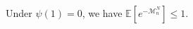 \begin{lemma}\label{lemma:M:exp-neg-moment-slide}
Under $\psi(1)=0$, we have $\mathbb E[e^{-\mathcal M^N_n}]\le 1$.
\end{lemma}
